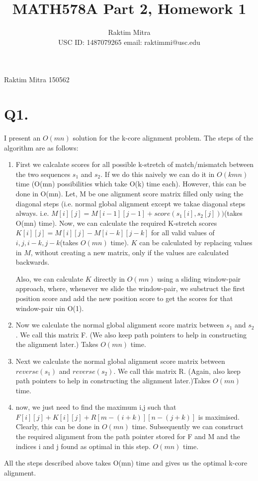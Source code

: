 \documentclass[a4paper,11pt]{article}
\begin{document}
\title{MATH578A Part 2, Homework 1 }
\author{Raktim Mitra \\ \small{USC ID: 1487079265\hspace{10pt} email: raktimmi@usc.edu}}
\maketitle
{}                              					%
								{Raktim Mitra}      						           		%
								{150562}																		%
								
\section*{Q1. }
I present an $O(mn)$ solution for the k-core alignment problem. The steps of the algorithm are as follows:
\begin{enumerate}
 \item First we calcalate scores for all possible k-stretch of match/mismatch between the two sequences $s_1$ and $s_2$. If we do this naively we can do it in $O(kmn)$ time (O(mn) possibilities which take O(k) time each). However, this can be done in O(mn). Let, M be one alignment score matrix  filled only using the diagonal steps (i.e. normal global alignment except we takae diagonal steps always. i.e. $M[i][j] = M[i-1][j-1] + score(s_1[i],s_2[j]))$(takes O(mn) time). Now, we can calculate the required K-stretch scores $K[i][j] = M[i][j] - M[i-k][j-k]$ for all valid values of $i,j,i-k,j-k$(takes $O(mn)$ time). $K$ can be calculated by replacing values in $M$, without creating a new matrix, only if the values are calculated backwards. 
 
 Also, we can calculate $K$ directly in $O(mn)$ using a sliding window-pair approach, where, whenever we slide the window-pair, we substruct the first position score and add the new position score to get the scores for that window-pair uin O(1). 
\item   Now we calculate the normal global alignment score matrix between $s_1$ and $s_2$. We call this matrix F. (We also keep path pointers to help in constructing the alignment later.) Takes $O(mn)$ time.
\item   Next we calculate the normal global alignment score matrix between $reverse(s_1)$ and $reverse(s_2)$. We call this matrix R. (Again, also keep path pointers to help in constructing the alignment later.)Takes $O(mn)$ time.
\item now, we just need to find the maximum i,j such that $F[i][j]+K[i][j]+R[m-(i+k)][n-(j+k)]$ is maximised.  Clearly, this can be done in $O(mn)$ time. Subsequently we can construct the required alignment from the path pointer stored for F and M and the indices i and j found as optimal in this step. $O(mn)$ time.
\end{enumerate}
All the steps described above takes O(mn) time and gives us the optimal k-core alignment.
\end{document}
